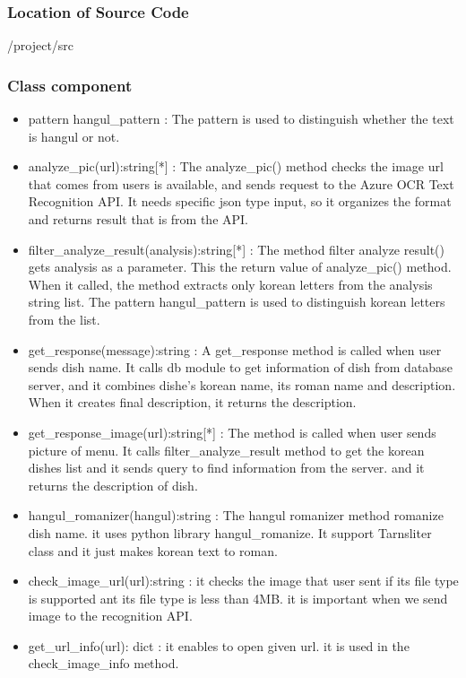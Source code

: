\subsubsection {Location of Source Code}
/project/src \newline

\subsubsection {Class component}

\begin{itemize}

\item pattern hangul\_pattern : The pattern is used to distinguish whether the text is hangul or not. \newline
\item analyze\_pic(url):string[*] : The analyze\_pic() method checks the image url that comes from users is available, and sends request to the Azure OCR Text Recognition API. It needs specific json type input, so it organizes the format and returns result that is from the API. \newline
\item filter\_analyze\_result(analysis):string[*] : The method filter analyze result() gets analysis as a parameter. This the return value of analyze\_pic() method. When it called, the method extracts only korean letters from the analysis string list. The pattern hangul\_pattern is used to distinguish korean letters from the list. \newline
\item get\_response(message):string : A get\_response method is called when user sends dish name. It calls db module to get information of dish from database server, and it combines dishe's korean name, its roman name and description. When it creates final description, it returns the description. \newline
\item get\_response\_image(url):string[*] : The method is called when user sends picture of menu. It calls filter\_analyze\_result method to get the korean dishes list and it sends query to find information from the server. and it returns the description of dish. \newline
\item hangul\_romanizer(hangul):string : The hangul romanizer method romanize dish name. it uses python library hangul\_romanize. It support Tarnsliter class and it just makes korean text to roman. \newline
\item check\_image\_url(url):string : it checks the image that user sent if its file type is supported ant its file type is less than 4MB. it is important when we send image to the recognition API. \newline
\item get\_url\_info(url): dict : it enables to open given url. it is used in the check\_image\_info method. \newline
\end{itemize} 

